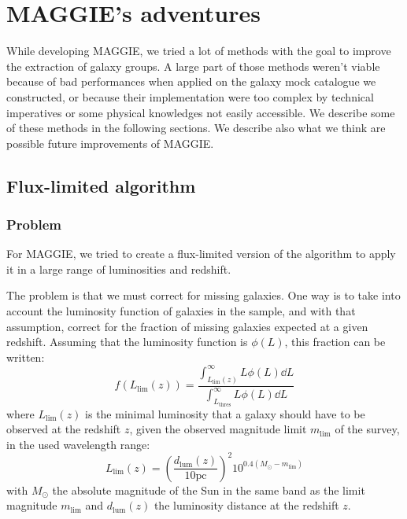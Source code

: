 \chapter[MAGGIE's adventures]{MAGGIE's adventures}
\label{cha:MAGGIE_adventures}

While developing MAGGIE, we tried a lot of methods with the goal to improve the
extraction of galaxy groups. A large part of those methods weren't viable
because of bad performances when applied on the galaxy mock catalogue we
constructed, or because their implementation were too complex by technical
imperatives or some physical knowledges not easily accessible. We describe some
of these methods in the following sections. We describe also what we think are
possible future improvements of MAGGIE\@.

\section{Flux-limited algorithm}

\subsection{Problem}

For MAGGIE, we tried to create a flux-limited version of the algorithm to apply
it in a large range of luminosities and redshift.

The problem is that we must correct for missing galaxies. One way is to take
into account the luminosity function of galaxies in the sample, and with that
assumption, correct for the fraction of missing galaxies expected at a given
redshift. Assuming that the luminosity function is $\phi\left(L\right)$, this
fraction can be written:
%
\begin{equation}\label{eq:correc}
    f\left(L_{\lim}\left(z\right)\right)=
    \frac{\int_{L_{\lim}\left(z\right)}^\infty L\phi\left(L\right)\dd L}
    {\int_{L_\mathrm{thres}}^\infty L\phi\left(L\right)\dd L}
\end{equation}
%
where $L_{\lim}\left(z\right)$ is the minimal luminosity that a galaxy should
have to be observed at the redshift $z$, given the observed magnitude limit
$m_{\lim}$ of the survey, in the used wavelength range:
%
\begin{equation}
    L_{\lim}\left(z\right)=
    {\left(\frac{d_\mathrm{lum}\left(z\right)}{10\mathrm{pc}}\right)}^2
    10^{0.4\left(M_{\odot}-m_{\lim}\right)}
\end{equation}
%
with $M_\odot$ the absolute magnitude of the Sun in the same band as the limit
magnitude $m_{\lim}$ and $d_\mathrm{lum} \left(z\right)$ the luminosity
distance at the redshift $z$.

